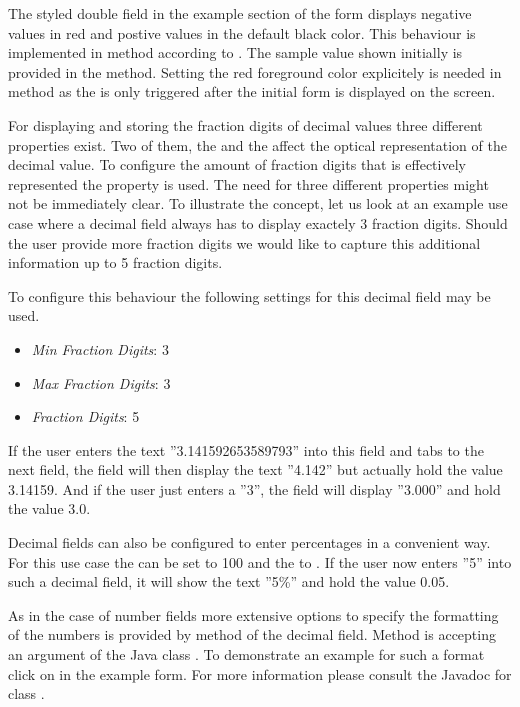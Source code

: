 \documentclass[a4paper,10pt,twoside]{book}
\begin{document}
The styled double field in the example section of the form displays negative values in red and postive values in the default black color. 
This behaviour is implemented in method  according to . 
The sample value shown initially is provided in the  method. 
Setting the red foreground color explicitely is needed in method  as the  is only triggered after the initial form is displayed on the screen. 

For displaying and storing the fraction digits of decimal values three different properties exist. 
Two of them, the  and the  affect the optical representation of the decimal value. 
To configure the amount of fraction digits that is effectively represented the property  is used. 
The need for three different properties might not be immediately clear. 
To illustrate the concept, let us look at an example use case where a decimal field always has to display exactely 3 fraction digits. 
Should the user provide more fraction digits we would like to capture this additional information up to 5 fraction digits. 

To configure this behaviour the following settings for this decimal field may be used.

\begin{itemize}
  \item \textit{Min Fraction Digits}: 3
  \item \textit{Max Fraction Digits}: 3
  \item \textit{Fraction Digits}: 5
\end{itemize}

If the user enters the text ''3.141592653589793'' into this field and tabs to the next field, the field will then display the text ''4.142'' but actually hold the value 3.14159. 
And if the user just enters a ''3'', the field will display ''3.000'' and hold the value 3.0.

Decimal fields can also be configured to enter percentages in a convenient way. 
For this use case the  can be set to 100 and the  to . 
If the user now enters ''5'' into such a decimal field, it will show the text ''5\%'' and hold the value 0.05.

As in the case of number fields more extensive options to specify the formatting of the numbers is provided by  method of the decimal field. 
Method  is accepting an argument of the Java class . 
To demonstrate an example for such a format click on  in the example form. 
For more information please consult the Javadoc for class .
\end{document}
